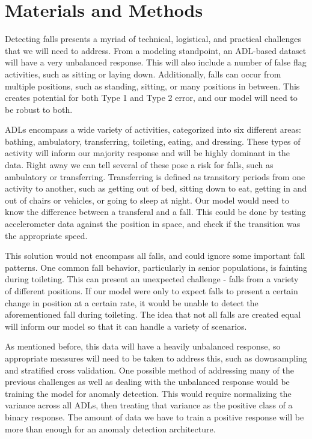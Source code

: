 \documentclass{llncs}
\begin{document}
\begin{table}
\begin{center}
\begin{tabular}{|c|c|c|}
			\bottomrule
		\end{tabular}
	\end{center}
\end{table}   
    
    
\section{Materials and Methods}
Detecting falls presents a myriad of technical, logistical, and practical challenges that we will need to address. From a modeling standpoint, an ADL-based dataset will have a very unbalanced response. This will also include a number of false flag activities, such as sitting or laying down. Additionally, falls can occur from multiple positions, such as standing, sitting, or many positions in between. This creates potential for both Type 1 and Type 2 error, and our model will need to be robust to both.
    
    ADLs encompass a wide variety of activities, categorized into six different areas: bathing, ambulatory, transferring, toileting, eating, and dressing. These types of activity will inform our majority response and will be highly dominant in the data. Right away we can tell several of these pose a risk for falls, such as ambulatory or transferring. Transferring is defined as transitory periods from one activity to another, such as getting out of bed, sitting down to eat, getting in and out of chairs or vehicles, or going to sleep at night. Our model would need to know the difference between a transferal and a fall. This could be done by testing accelerometer data against the position in space, and check if the transition was the appropriate speed. 
    
    This solution would not encompass all falls, and could ignore some important fall patterns. One common fall behavior, particularly in senior populations, is fainting during toileting. This can present an unexpected challenge - falls from a variety of different positions. If our model were only to expect falls to present a certain change in position at a certain rate, it would be unable to detect the aforementioned fall during toileting. The idea that not all falls are created equal will inform our model so that it can handle a variety of scenarios.
    
    As mentioned before, this data will have a heavily unbalanced response, so appropriate measures will need to be taken to address this, such as downsampling and stratified cross validation. One possible method of addressing many of the previous challenges as well as dealing with the unbalanced response would be training the model for anomaly detection. This would require normalizing the variance across all ADLs, then treating that variance as the positive class of a binary response. The amount of data we have to train a positive response will be more than enough for an anomaly detection architecture.
    
\end{document}
